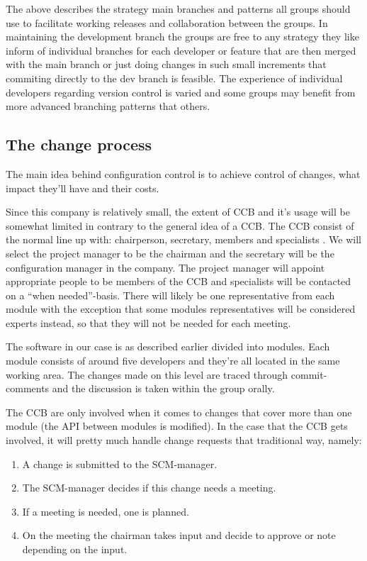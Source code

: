 \documentclass[a4paper,11pt]{article}
\begin{document}
The above describes the strategy main branches and patterns all groups should
use to facilitate working releases and collaboration between the groups. In
maintaining the development branch the groups are free to any strategy they
like inform of individual branches for each developer or feature that are then
merged with the main branch or just doing changes in such small increments that
commiting directly to the dev branch is feasible. The experience of individual
developers regarding version control is varied and some groups may benefit from
more advanced branching patterns that others.


\subsection{The change process}
The main idea behind configuration control is to achieve control of changes,
what impact they'll have and their costs.

Since this company is relatively small, the extent of CCB and it's usage will be
somewhat limited in contrary to the general idea of a CCB. The CCB consist of
the normal line up with: chairperson, secretary, members and specialists
\cite{daniels}. We will select the project manager to be the chairman and the
secretary will be the configuration manager in the company. The project manager
will appoint appropriate people to be members of the CCB and specialists will be
contacted on a ``when needed''-basis. There will likely be one representative
from each module with the exception that some modules representatives will be
considered experts instead, so that they will not be needed for each meeting.

The software in our case is as described earlier divided into modules. Each
module consists of around five developers and they're all located in the same
working area. The changes made on this level are traced through commit-comments
and the discussion is taken within the group orally.

The CCB are only involved when it comes to changes that cover more than one
module (the API between modules is modified). In the case that the CCB gets
involved, it will pretty much handle change requests that traditional way,
namely:

\begin{enumerate}
 \item A change is submitted to the SCM-manager.
 \item The SCM-manager decides if this change needs a meeting.
 \item If a meeting is needed, one is planned.
 \item On the meeting the chairman takes input and decide to approve or note
depending on the input.
\end{enumerate}
\end{document}
